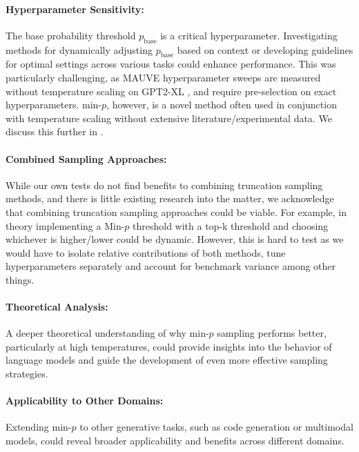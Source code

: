 \documentclass{article}
\begin{document}
\paragraph{Hyperparameter Sensitivity:} The base probability threshold \( p_{\text{base}} \) is a critical hyperparameter. Investigating methods for dynamically adjusting \( p_{\text{base}} \) based on context or developing guidelines for optimal settings across various tasks could enhance performance. This was particularly challenging, as MAUVE hyperparameter sweeps are measured without temperature scaling on GPT2-XL \citep{pillutla-etal:mauve:jmlr2023}, and require pre-selection on exact hyperparameters. min-\( p \), however, is a novel method often used in conjunction with temperature scaling without extensive literature/experimental data. We discuss this further in .

\paragraph{Combined Sampling Approaches:} While our own tests do not find benefits to combining truncation sampling methods, and there is little existing research into the matter, we acknowledge that combining truncation sampling approaches could be viable. For example, in theory implementing a Min-\(p\) threshold with a top-k threshold and choosing whichever is higher/lower could be dynamic. However, this is hard to test as we would have to isolate relative contributions of both methods, tune hyperparameters separately and account for benchmark variance among other things.

\paragraph{Theoretical Analysis:} A deeper theoretical understanding of why min-\( p \) sampling performs better, particularly at high temperatures, could provide insights into the behavior of language models and guide the development of even more effective sampling strategies.

\paragraph{Applicability to Other Domains:} Extending min-\( p \) to other generative tasks, such as code generation or multimodal models, could reveal broader applicability and benefits across different domains.
\end{document}
